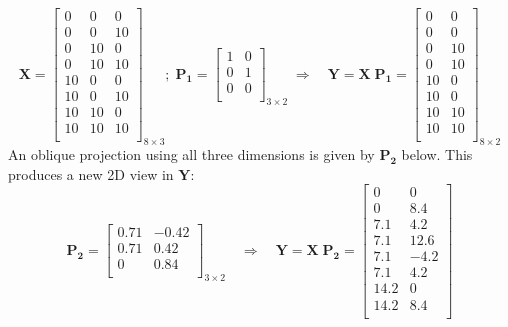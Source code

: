 \documentclass[
  letterpaper,
  10pt,
  krantz2]{krantz}
\begin{document}
{\[
\mathbf{X} =
\begin{bmatrix} 
    0 & 0 & 0 \\ 
    0 & 0 & 10 \\ 
    0 & 10 & 0 \\ 
    0 & 10 & 10 \\ 
    10 & 0 & 0 \\ 
    10 & 0 & 10 \\ 
    10 & 10 & 0 \\ 
    10 & 10 & 10 \\ 
 \end{bmatrix}_{8 \times 3}
 ;\;
 \mathbf{P_1} =
 \begin{bmatrix} 
    1 & 0 \\ 
    0 & 1 \\ 
    0 & 0 \\ 
 \end{bmatrix}_{3 \times 2} 
 \;\Rightarrow\quad
 \mathbf{Y} = \mathbf{X} \; \mathbf{P_1} =
 \begin{bmatrix} 
    0 & 0 \\ 
    0 & 0 \\ 
    0 & 10 \\ 
    0 & 10 \\ 
    10 & 0 \\ 
    10 & 0 \\ 
    10 & 10 \\ 
    10 & 10 \\ 
 \end{bmatrix}_{8 \times 2} 
\] An oblique projection using all three dimensions is given by
\(\mathbf{P_2}\) below. This produces a new 2D view in \(\mathbf{Y}\):
\[
 \mathbf{P_2} =
\begin{bmatrix} 
    0.71 & -0.42 \\ 
    0.71 & 0.42 \\ 
    0 & 0.84 \\ 
 \end{bmatrix}_{3 \times 2}
 \quad\Rightarrow\quad
 \mathbf{Y} = \mathbf{X} \; \mathbf{P_2} =
\begin{bmatrix} 
    0 & 0 \\ 
    0 & 8.4 \\ 
    7.1 & 4.2 \\ 
    7.1 & 12.6 \\ 
    7.1 & -4.2 \\ 
    7.1 & 4.2 \\ 
    14.2 & 0 \\ 
    14.2 & 8.4 \\ 
 \end{bmatrix} 
\]

}
\end{document}
